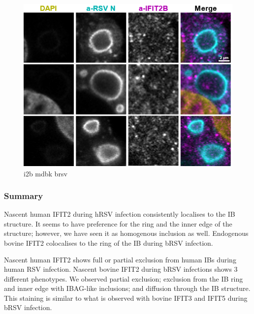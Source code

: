 \begin{figure}
    \centering
    \includegraphics[width=1\linewidth]{10. Chapter 5/Figs/01. Infection/08. i2b mdbk brsv.png}
    \caption[i2b mdbk brsv]{i2b mdbk brsv}
    \label{fig:i2b mdbk brsv}
\end{figure}

\subsubsection{Summary} \label{Summary-i2-infection}
Nascent human IFIT2 during hRSV infection consistently localises to the IB structure. It seems to have preference for the ring and the inner edge of the structure; however, we have seen it as homogenous inclusion as well. Endogenous bovine IFIT2 colocalises to the ring of the IB during bRSV infection.

Nascent human IFIT2 shows full or partial exclusion from human IBs during human RSV infection. Nascent bovine IFIT2 during bRSV infections shows 3 different phenotypes. We observed partial exclusion; exclusion from the IB ring and inner edge with IBAG-like inclusions; and diffusion through the IB structure. This staining is similar to what is observed with bovine IFIT3 and IFIT5 during bRSV infection.